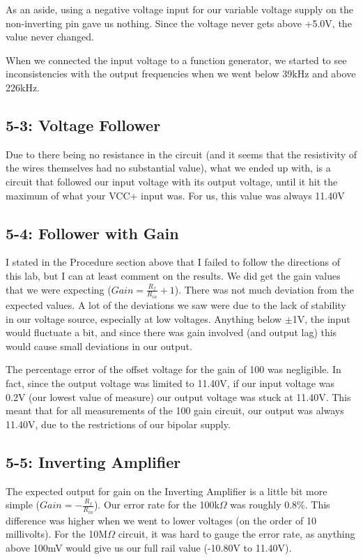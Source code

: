 \documentclass[%
 aip,
 jmp,
 amsmath,
 amssymb,
 reprint,%
 numerical,
 longbibliography,
]{revtex4-1}
\begin{document}
	As an aside, using a negative voltage input for our variable voltage supply on the non-inverting pin gave us nothing. Since the voltage never gets
	above +5.0V, the value never changed.
	
	When we connected the input voltage to a function generator, we started to see inconsistencies with the output frequencies when we went below
	39kHz and above 226kHz.
	
	\subsection{5-3: Voltage Follower}
	
	Due to there being no resistance in the circuit (and it seems that the resistivity of the wires themselves
	had no substantial value), what we ended up with, is a circuit that followed our input voltage with its output voltage, until it hit the maximum
	of what your VCC+ input was. For us, this value was always 11.40V
	
	\subsection{5-4: Follower with Gain}
	
	I stated in the Procedure section above that I failed to follow the directions of this lab, but I can at least comment on the results. We did get
	the gain values that we were expecting ($Gain = \frac{R_f}{R_{in}} + 1$). There was not much deviation from the expected values. A lot of the
	deviations we saw were due to the lack of stability in our voltage source, especially at low voltages. Anything below $\pm$1V, the input would
	fluctuate a bit, and since there was gain involved (and output lag) this would cause small deviations in our output.
	
	The percentage error of the offset voltage for the gain of 100 was negligible. In fact,
	since the output voltage was limited to 11.40V, if our input voltage was 0.2V (our lowest value of measure) our output voltage was stuck at 11.40V.
	This meant that for all measurements of the 100 gain circuit, our output was always 11.40V, due to the restrictions of our bipolar supply. 
	
	\subsection{5-5: Inverting Amplifier}
	
	The expected output for gain on the Inverting Amplifier is a little bit more simple ($Gain = -\frac{R_f}{R_{in}}$). Our error rate for the 100k$\Omega$
	was roughly 0.8\%. This difference was higher when we went to lower voltages (on the order of 10 millivolts). For the 10M$\Omega$ circuit, it was hard to
	gauge the error rate, as anything above 100mV would give us our full rail value (-10.80V to 11.40V). 
	
\end{document}
